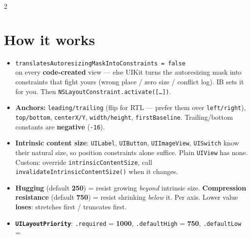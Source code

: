 \documentclass[8pt]{extarticle}
\begin{document}



\begin{multicols}{2}
\raggedright

\section{How it works}
\begin{itemize}
  \item \texttt{translatesAutoresizingMaskIntoConstraints = false}\\
        on every \textbf{code-created} view — else UIKit turns the autoresizing mask into constraints that fight yours
        (wrong place / zero size / conflict log). IB sets it for you. Then
        \texttt{NSLayoutConstraint.activate([…])}.
  \item \textbf{Anchors:} \texttt{leading/trailing} (flip for RTL — prefer
        them over \texttt{left/right}), \texttt{top/bottom},
        \texttt{centerX/Y}, \texttt{width/height},
        \texttt{firstBaseline}. Trailing/bottom constants are
        \textbf{negative} (\texttt{-16}).
  \item \textbf{Intrinsic content size}: \texttt{UILabel}, \texttt{UIButton},
        \texttt{UIImageView}, \texttt{UISwitch} know their natural size, so
        position constraints alone suffice. Plain \texttt{UIView} has none.
        Custom: override \texttt{intrinsicContentSize}, call
        \texttt{invalidateIntrinsicContentSize()} when it changes.
  \item \textbf{Hugging} (default \textbf{250}) = resist growing
        \emph{beyond} intrinsic size. \textbf{Compression resistance} (default
        \textbf{750}) = resist shrinking \emph{below} it. Per axis. Lower value
        \textbf{loses}: stretches first / truncates first.
  \item \textbf{\texttt{UILayoutPriority}}: \texttt{.required} = \textbf{1000},
        \texttt{.defaultHigh} = \textbf{750}, \texttt{.defaultLow} =

\end{itemize}
\end{multicols}
\end{document}
